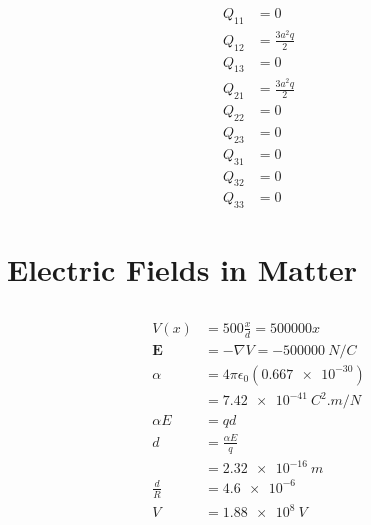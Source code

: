 \documentclass{article}
\renewcommand{\vec}[1]{\boldsymbol{\mathbf{#1}}}
\begin{document}
\begin{enumerate}
        \begin{align*}
          Q_{1 1} & = 0                 \\
          Q_{1 2} & = \frac{3 a^2 q}{2} \\
          Q_{1 3} & = 0                 \\
          Q_{2 1} & = \frac{3 a^2 q}{2} \\
          Q_{2 2} & = 0                 \\
          Q_{2 3} & = 0                 \\
          Q_{3 1} & = 0                 \\
          Q_{3 2} & = 0                 \\
          Q_{3 3} & = 0
        \end{align*}
\end{enumerate}

\section{Electric Fields in Matter}

\subsection{}

\begin{align*}
  V(x)        & = 500 \frac{x}{d} = \num{500000} x   \\
  \vec{E}     & = -\nabla V = \qty{-500000}{N/C}     \\
  \alpha      & = 4 \pi \epsilon_0 (\num{0.667e-30}) \\
              & = \qty{7.42e-41}{C^2.m/N}            \\
  \alpha E    & = q d                                \\
  d           & = \frac{\alpha E}{q}                 \\
              & = \qty{2.32e-16}{m}                  \\
  \frac{d}{R} & = \num{4.6e-6}                       \\
  V           & = \qty{1.88e8}{V}
\end{align*}

\subsection{}
\end{document}
